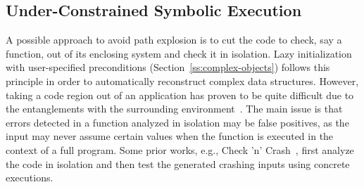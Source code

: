 \subsection{Under-Constrained Symbolic Execution} 
\label{under-constrained}

A possible approach to avoid path explosion is to cut the code to check, say a function, out of its enclosing system and check it in isolation. Lazy initialization with user-specified preconditions (Section~\ref{ss:complex-objects}) follows this principle in order to automatically reconstruct complex  data structures. However, taking a code region out of an application has proven to be quite difficult due to the entanglements with the surrounding environment~\cite{ED-ISSTA07}.
The main issue is that errors detected in a function analyzed in isolation may be false positives, as the input may never assume certain values when the function is executed in the context of a full program. Some prior works, e.g., {\sc Check 'n' Crash}~\cite{CS-ICSE05}, first analyze the code in isolation and then test the generated crashing inputs using concrete executions.


